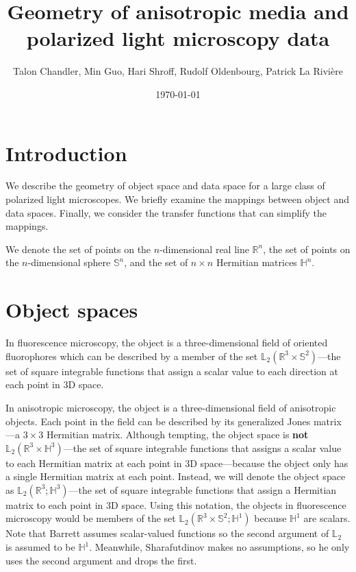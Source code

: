 \documentclass[11pt]{article}
\providecommand{\mbb}[1]{\mathbb{#1}}
\begin{document}
\title{\vspace{-2.5em} Geometry of anisotropic media and polarized light
  microscopy data \vspace{-1em}} \author{Talon Chandler, Min Guo, Hari Shroff,
  Rudolf Oldenbourg, Patrick La Rivi\`ere}
\date{\vspace{-1em}\today\vspace{-1em}}
\maketitle
\section{Introduction}
We describe the geometry of object space and data space for a large class of
polarized light microscopes. We briefly examine the mappings between object
and data spaces. Finally, we consider the transfer functions that can simplify
the mappings.

We denote the set of points on the $n$-dimensional real line $\mbb{R}^n$, the
set of points on the $n$-dimensional sphere $\mbb{S}^n$, and the set of
$n\times n$ Hermitian matrices $\mbb{H}^n$.

\section{Object spaces}
In fluorescence microscopy, the object is a three-dimensional field of oriented
fluorophores which can be described by a member of the set
$\mbb{L}_2(\mbb{R}^3\times\mbb{S}^2)$---the set of square integrable functions that
assign a scalar value to each direction at each point in 3D space.

In anisotropic microscopy, the object is a three-dimensional field of
anisotropic objects. Each point in the field can be described by its
generalized Jones matrix \cite{ortega13}---a $3\times3$ Hermitian matrix.
Although tempting, the object space is \textbf{not}
$\mbb{L}_2(\mbb{R}^3 \times \mbb{H}^3)$---the set of square integrable functions
that assigns a scalar value to each Hermitian matrix at each point in 3D
space---because the object only has a single Hermitian matrix at each point.
Instead, we will denote the object space as
$\mbb{L}_2(\mbb{R}^3; \mbb{H}^3)$---the set of square integrable functions that
assign a Hermitian matrix to each point in 3D space. Using this notation, the
objects in fluorescence microscopy would be members of the set
$\mbb{L}_2(\mbb{R}^3\times\mbb{S}^2; \mbb{H}^1)$ because $\mbb{H}^1$ are
scalars. Note that Barrett \cite{barrett2004} assumes scalar-valued functions so
the second argument of $\mbb{L}_2$ is assumed to be $\mbb{H}^1$. Meanwhile,
Sharafutdinov \cite{shara1994} makes no assumptions, so he only uses the second
argument and drops the first.
\end{document}
